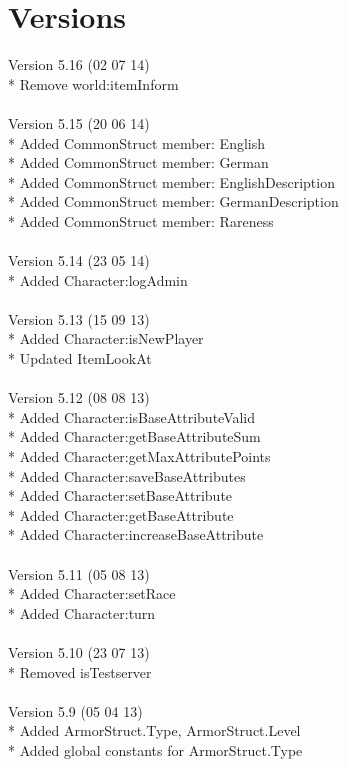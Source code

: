 \documentclass[a4paper,10pt,makeidx]{scrreprt}
\begin{document}
\chapter{Versions}
Version 5.16 (02 07 14)\\
* Remove world:itemInform\\
\\
Version 5.15 (20 06 14)\\
* Added CommonStruct member: English\\
* Added CommonStruct member: German\\
* Added CommonStruct member: EnglishDescription\\
* Added CommonStruct member: GermanDescription\\
* Added CommonStruct member: Rareness\\
\\
Version 5.14 (23 05 14)\\
* Added Character:logAdmin\\
\\
Version 5.13 (15 09 13)\\
* Added Character:isNewPlayer\\
* Updated ItemLookAt\\
\\
Version 5.12 (08 08 13)\\
* Added Character:isBaseAttributeValid\\
* Added Character:getBaseAttributeSum\\
* Added Character:getMaxAttributePoints\\
* Added Character:saveBaseAttributes\\
* Added Character:setBaseAttribute\\
* Added Character:getBaseAttribute\\
* Added Character:increaseBaseAttribute\\
\\
Version 5.11 (05 08 13)\\
* Added Character:setRace\\
* Added Character:turn\\
\\
Version 5.10 (23 07 13)\\
* Removed isTestserver\\
\\
Version 5.9 (05 04 13)\\
* Added ArmorStruct.Type, ArmorStruct.Level\\
* Added global constants for ArmorStruct.Type\\
\end{document}
